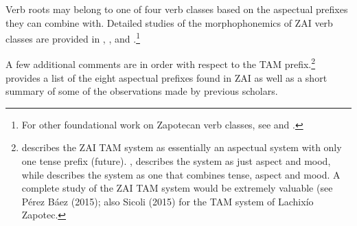 Verb roots may belong to one of four verb classes based on the aspectual prefixes they can combine with. Detailed studies of the morphophonemics of ZAI verb classes are provided in \citet{marlett1987}, \citet{enriquez2008}, and \citet{perez2015}.\footnote{For other foundational work on Zapotecan verb classes, see \citet{smithstark2002} and \citet{campbell2011}.}

A few additional comments are in order with respect to the TAM prefix.\footnote{\citet{pickett1998} describes the ZAI TAM system as essentially an aspectual system with only one tense prefix (future). \citet{mock1990}, describes the system as just aspect and mood, while \citet{suarez1983} describes the system as one that combines tense, aspect and mood. A complete study of the ZAI TAM system would be extremely valuable (see P\'{e}rez B\'{a}ez (2015); also Sicoli (2015) for the TAM system of Lachix\'{i}o Zapotec.}  provides a list of the eight aspectual prefixes found in ZAI as well as a short summary of some of the observations made by previous scholars.  

